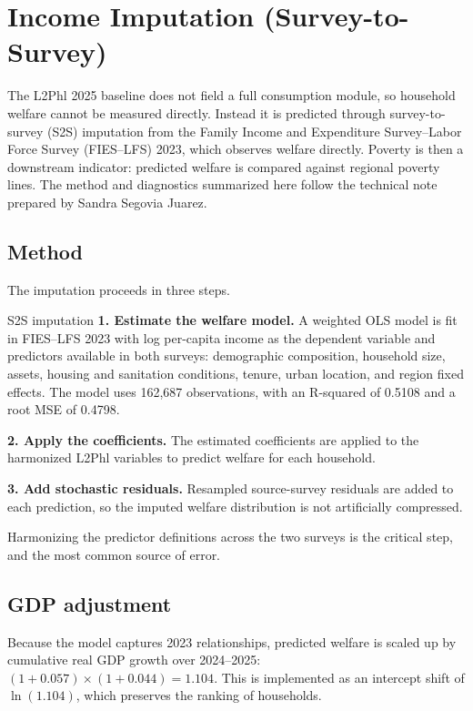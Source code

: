 
\section{Income Imputation (Survey-to-Survey)}

The L2Phl 2025 baseline does not field a full consumption module, so
household welfare cannot be measured directly. Instead it is predicted
through survey-to-survey (S2S) imputation from the Family Income and
Expenditure Survey--Labor Force Survey (FIES--LFS) 2023, which observes
welfare directly. Poverty is then a downstream indicator: predicted
welfare is compared against regional poverty lines. The method and
diagnostics summarized here follow the technical note prepared by
Sandra Segovia Juarez.

\subsection{Method}

The imputation proceeds in three steps.

\begin{procbox}{S2S imputation}
\textbf{1. Estimate the welfare model.} A weighted OLS model is fit in
FIES--LFS 2023 with log per-capita income as the dependent variable and
predictors available in both surveys: demographic composition, household
size, assets, housing and sanitation conditions, tenure, urban location,
and region fixed effects. The model uses 162{,}687 observations, with an
R-squared of 0.5108 and a root MSE of 0.4798.

\textbf{2. Apply the coefficients.} The estimated coefficients are
applied to the harmonized L2Phl variables to predict welfare for each
household.

\textbf{3. Add stochastic residuals.} Resampled source-survey residuals
are added to each prediction, so the imputed welfare distribution is not
artificially compressed.
\end{procbox}

Harmonizing the predictor definitions across the two surveys is the
critical step, and the most common source of error.

\subsection{GDP adjustment}

Because the model captures 2023 relationships, predicted welfare is
scaled up by cumulative real GDP growth over 2024--2025:
$(1 + 0.057) \times (1 + 0.044) = 1.104$. This is implemented as an
intercept shift of $\ln(1.104)$, which preserves the ranking of
households.

